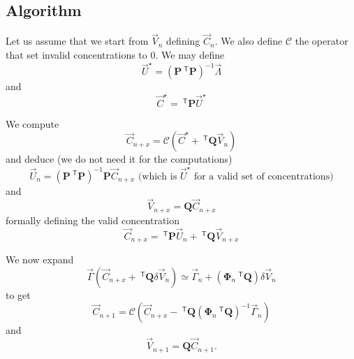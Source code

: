 \documentclass[aps]{revtex4}
\newcommand{\mymat}[1]{\bm{#1}}
\newcommand{\mytrn}[1]{~^{\mathsf{T}}{#1}}
\begin{document}
\subsection{Algorithm}

Let us assume that we start from $\vec{V}_n$ defining $\vec{C}_n$.
We also define $\mathcal{C}$ the operator that set invalid concentrations to $0$.
We may define 
\begin{equation}
\vec{U}^\star = \left(\mymat{P}\mytrn{\mymat{P}}\right)^{-1} \vec{\Lambda}
\end{equation}
and 
\begin{equation}
\vec{C}^\star = \mytrn{\mymat{P}} \vec{U}^\star
\end{equation}

We compute 
\begin{equation}
	\vec{C}_{n+x} = \mathcal{C}\left(\vec{C}^\star+\mytrn{\mymat{Q}} \vec{V}_n\right)
\end{equation}
and deduce (we do not need it for the computations)
\begin{equation}
	\vec{U}_{n} = \left(\mymat{P}\mytrn{\mymat{P}}\right)^{-1} \mymat{P}\vec{C}_{n+x} \text{ (which is $\vec{U}^\star$ for a valid set of concentrations)}
\end{equation}
and
\begin{equation}
	\vec{V}_{n+x} = \mymat{Q} \vec{C}_{n+x}
\end{equation}
formally defining the valid concentration
\begin{equation}
	\vec{C}_{n+x} = \mytrn{\mymat{P}} \vec{U}_{n} + \mytrn{\mymat{Q}} \vec{V}_{n+x}
\end{equation}

We now expand 
\begin{equation}
\vec{\Gamma}\left(\vec{C}_{n+x}+\mytrn{\mymat{Q}} \delta\vec{V}_n\right) \simeq
\vec{\Gamma}_n + \left(\mymat{\Phi}_n \mytrn{\mymat{Q}}\right) \delta \vec{V}_n
\end{equation}
to get
\begin{equation}
	\vec{C}_{n+1} = \mathcal{C}\left(\vec{C}_{n+x} -  \mytrn{\mymat{Q}}\left(\mymat{\Phi}_n \mytrn{\mymat{Q}}\right)^{-1} \vec{\Gamma}_n\right)
\end{equation}
and
\begin{equation}
	\vec{V}_{n+1}   = \mymat{Q} \vec{C}_{n+1}.
\end{equation}
\end{document}

